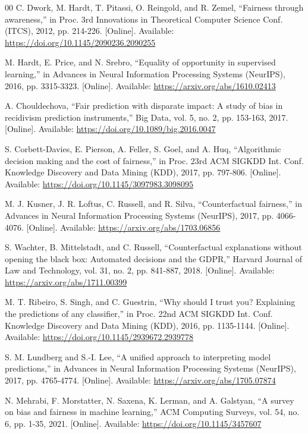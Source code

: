 \documentclass[conference]{IEEEtran}
\begin{document}
\begin{thebibliography}{00}
 C. Dwork, M. Hardt, T. Pitassi, O. Reingold, and R. Zemel, ``Fairness through awareness,'' in Proc. 3rd Innovations in Theoretical Computer Science Conf. (ITCS), 2012, pp. 214-226. [Online]. Available: \url{https://doi.org/10.1145/2090236.2090255}

 M. Hardt, E. Price, and N. Srebro, ``Equality of opportunity in supervised learning,'' in Advances in Neural Information Processing Systems (NeurIPS), 2016, pp. 3315-3323. [Online]. Available: \url{https://arxiv.org/abs/1610.02413}

 A. Chouldechova, ``Fair prediction with disparate impact: A study of bias in recidivism prediction instruments,'' Big Data, vol. 5, no. 2, pp. 153-163, 2017. [Online]. Available: \url{https://doi.org/10.1089/big.2016.0047}

 S. Corbett-Davies, E. Pierson, A. Feller, S. Goel, and A. Huq, ``Algorithmic decision making and the cost of fairness,'' in Proc. 23rd ACM SIGKDD Int. Conf. Knowledge Discovery and Data Mining (KDD), 2017, pp. 797-806. [Online]. Available: \url{https://doi.org/10.1145/3097983.3098095}

 M. J. Kusner, J. R. Loftus, C. Russell, and R. Silva, ``Counterfactual fairness,'' in Advances in Neural Information Processing Systems (NeurIPS), 2017, pp. 4066-4076. [Online]. Available: \url{https://arxiv.org/abs/1703.06856}

 S. Wachter, B. Mittelstadt, and C. Russell, ``Counterfactual explanations without opening the black box: Automated decisions and the GDPR,'' Harvard Journal of Law and Technology, vol. 31, no. 2, pp. 841-887, 2018. [Online]. Available: \url{https://arxiv.org/abs/1711.00399}

 M. T. Ribeiro, S. Singh, and C. Guestrin, ``Why should I trust you? Explaining the predictions of any classifier,'' in Proc. 22nd ACM SIGKDD Int. Conf. Knowledge Discovery and Data Mining (KDD), 2016, pp. 1135-1144. [Online]. Available: \url{https://doi.org/10.1145/2939672.2939778}

 S. M. Lundberg and S.-I. Lee, ``A unified approach to interpreting model predictions,'' in Advances in Neural Information Processing Systems (NeurIPS), 2017, pp. 4765-4774. [Online]. Available: \url{https://arxiv.org/abs/1705.07874}

 N. Mehrabi, F. Morstatter, N. Saxena, K. Lerman, and A. Galstyan, ``A survey on bias and fairness in machine learning,'' ACM Computing Surveys, vol. 54, no. 6, pp. 1-35, 2021. [Online]. Available: \url{https://doi.org/10.1145/3457607}


\end{thebibliography}
\end{document}

